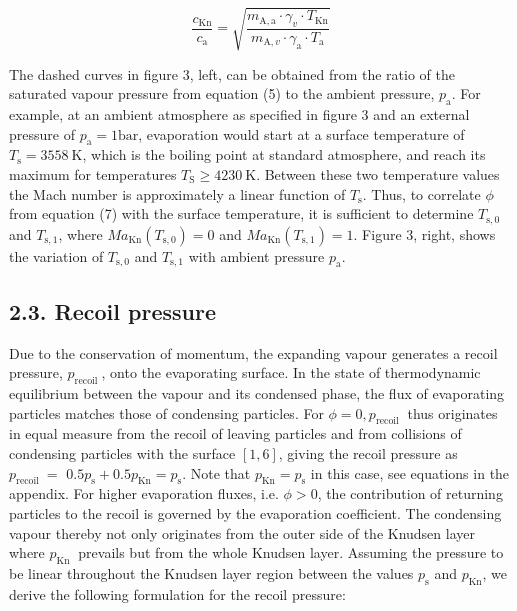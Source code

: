 \documentclass[10pt]{article}
\begin{document}
\begin{equation*}
\frac{c_{\mathrm{Kn}}}{c_{\mathrm{a}}}=\sqrt{\frac{m_{\mathrm{A}, \mathrm{a}} \cdot \gamma_{v} \cdot T_{\mathrm{Kn}}}{m_{\mathrm{A}, v} \cdot \gamma_{\mathrm{a}} \cdot T_{\mathrm{a}}}} \tag{9}
\end{equation*}


The dashed curves in figure 3, left, can be obtained from the ratio of the saturated vapour pressure from equation (5) to the ambient pressure, $p_{\mathrm{a}}$. For example, at an ambient atmosphere as specified in figure 3 and an external pressure of $p_{\mathrm{a}}=1 \mathrm{bar}$, evaporation would start at a surface temperature of $T_{\mathrm{s}}=3558 \mathrm{~K}$, which is the boiling point at standard atmosphere, and reach its maximum for temperatures $T_{\mathrm{S}} \geqslant 4230 \mathrm{~K}$. Between these two temperature values the Mach number is approximately a linear function of $T_{\mathrm{s}}$. Thus, to correlate $\phi$ from equation (7) with the surface temperature, it is sufficient to determine $T_{\mathrm{s}, 0}$ and $T_{\mathrm{s}, 1}$, where $M a_{\mathrm{Kn}}\left(T_{\mathrm{s}, 0}\right)=0$ and $M a_{\mathrm{Kn}}\left(T_{\mathrm{s}, 1}\right)=1$. Figure 3, right, shows the variation of $T_{\mathrm{s}, 0}$ and $T_{\mathrm{s}, 1}$ with ambient pressure $p_{\mathrm{a}}$.

\subsection*{2.3. Recoil pressure}
Due to the conservation of momentum, the expanding vapour generates a recoil pressure, $p_{\text {recoil }}$, onto the evaporating surface. In the state of thermodynamic equilibrium between the vapour and its condensed phase, the flux of evaporating particles matches those of condensing particles. For $\phi=0, p_{\text {recoil }}$ thus originates in equal measure from the recoil of leaving particles and from collisions of condensing particles with the surface $[1,6]$, giving the recoil pressure as $p_{\text {recoil }}=$ $0.5 p_{\mathrm{s}}+0.5 p_{\mathrm{Kn}}=p_{\mathrm{s}}$. Note that $p_{\mathrm{Kn}}=p_{\mathrm{s}}$ in this case, see equations in the appendix. For higher evaporation fluxes, i.e. $\phi>0$, the contribution of returning particles to the recoil is governed by the evaporation coefficient. The condensing vapour thereby not only originates from the outer side of the Knudsen layer where $p_{\text {Kn }}$ prevails but from the whole Knudsen layer. Assuming the pressure to be linear throughout the Knudsen layer region between the values $p_{\mathrm{s}}$ and $p_{\mathrm{Kn}}$, we derive the following formulation for the recoil pressure:
\end{document}
